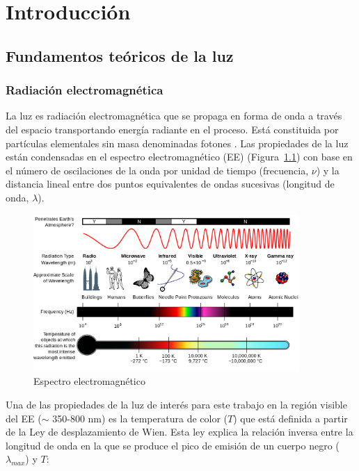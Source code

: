 \chapter{Introducción}


\section{Fundamentos teóricos de la luz}

\subsection{Radiación electromagnética}

La luz es radiación electromagnética que se propaga en forma de onda a través del espacio transportando energía radiante en el proceso. Está constituida por partículas elementales sin masa denominadas fotones \citep{Purcell&Morin2013}. Las propiedades de la luz están condensadas en el espectro electromagnético (EE) (Figura~\ref{espectroelectromagnetico}) con base en el número de oscilaciones de la onda por unidad de tiempo (frecuencia, $\nu$) y la distancia lineal entre dos puntos equivalentes de ondas sucesivas (longitud de onda, $\lambda$).\\

\begin{figure}
  \centering
    \includegraphics[width=0.9\textwidth]{espectroelectromagnetico}
  \caption{Espectro electromagnético \citep{NASA2007}}
  \label{espectroelectromagnetico}
\end{figure}

Una de las propiedades de la luz de interés para este trabajo en la región visible del EE ($\sim$ 350-800 nm) es la temperatura de color ($T$)  que está definida a partir de la Ley de desplazamiento de Wien. Esta ley explica la relación inversa entre la longitud de onda en la que se produce el pico de emisión de un cuerpo negro ($\lambda_{max}$) y $T$:

